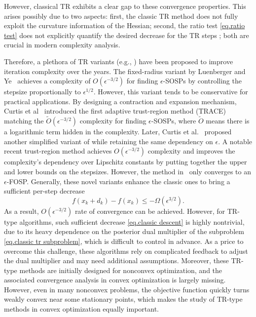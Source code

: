 However, classical TR exhibits a clear gap to these convergence properties. This arises possibly due to two aspects: first, the classic TR method does not fully exploit the curvature information of the Hessian; second, the ratio test \eqref{eq.ratio test} does not explicitly quantify the desired decrease for the TR steps \citep{curtis2017trust}; both are crucial in modern complexity analysis.

Therefore, a plethora of TR variants (e.g., \cite{curtis2017trust, curtis2021trust, grapigliaConvergenceWorstcaseComplexity2015, luenberger_linear_2021}) have been proposed to improve iteration complexity over the years. The fixed-radius variant by Luenberger and Ye~\cite{luenberger_linear_2021} achieves a complexity of $O(\epsilon^{-3/2})$ for finding $\epsilon$-SOSPs by controlling the stepsize proportionally to ${\epsilon}^{1/2}$. However, this variant tends to be conservative for practical applications. By designing a contraction and expansion mechanism, Curtis et al~\cite{curtis2017trust} introduced the first adaptive trust-region method (TRACE) matching the $\tilde{O}(\epsilon^{-3/2})$ complexity for finding $\epsilon$-SOSPs, where $\tilde{O}$ means there is a logarithmic term hidden in the complexity. Later, Curtis et al.~\cite{curtis2021trust} proposed another simplified variant of \cite{curtis2017trust} while retaining the same dependency on $\epsilon$. A notable recent trust-region method \cite{hamad2022consistently} achieves $O(\epsilon^{-3/2})$ complexity and improves the complexity's dependency over Lipschitz constants by putting together the upper and lower bounds on the stepsizes. However, the method in~\cite{hamad2022consistently} only converges to an $\epsilon$-FOSP. Generally, these novel variants enhance the classic ones to bring a sufficient per-step decrease
\begin{equation}\label{eq.classic descent}
    f(x_k+d_k) - f(x_k) \leq -\Omega(\epsilon^{3/2}).
\end{equation}
As a result, $O(\epsilon^{-3/2})$ rate of convergence can be achieved. However, for TR-type algorithms, such sufficient decrease \eqref{eq.classic descent} is highly nontrivial, due to its heavy dependence on the posterior dual multiplier of the subproblem \eqref{eq.classic tr subproblem}, which is difficult to control in advance. 
As a price to overcome this challenge, these algorithms rely on complicated feedback to adjust the dual multiplier and may need additional assumptions. Moreover, these TR-type methods are initially designed for nonconvex optimization, and the associated convergence analysis in convex optimization is
largely missing.
However, even in many nonconvex problems, the objective function quickly turns weakly convex near some stationary points, which makes the study of TR-type methods in convex optimization equally important.



